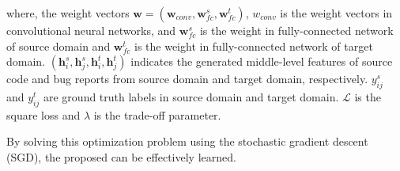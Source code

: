 where, the weight vectors $\mathbf{w}=(\mathbf{w}_{conv},\mathbf{w}^s_{fc},\mathbf{w}^t_{fc})$, $w_{conv}$ is the weight vectors in convolutional neural networks, and $\mathbf{w}^s_{fc}$ is the weight in fully-connected network of source domain and $\mathbf{w}^t_{fc}$ is the weight in fully-connected network of target domain. $(\mathbf{h}^s_i, \mathbf{h}^s_j, \mathbf{h}^t_i, \mathbf{h}^t_j)$ indicates the generated middle-level features of source code and bug reports from source domain and target domain, respectively. $y^s_{ij}$ and $y^t_{ij}$ are ground truth labels in source domain and target domain. $\mathcal{L}$ is the square loss and $\lambda$ is the trade-off parameter.

By solving this optimization problem using the stochastic gradient descent (SGD), the proposed \TRANPCNN can be effectively learned.

